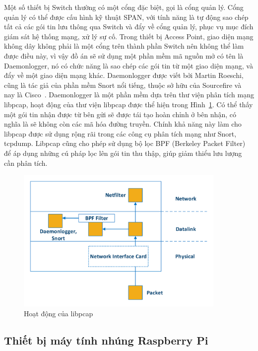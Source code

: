 Một số thiết bị Switch thường có một cổng đặc biệt, gọi là cổng quản lý. Cổng quản lý có thể được cấu hình kỹ thuật SPAN, với tính năng là tự động sao chép tất cả các gói tin lưu thông qua Switch và đẩy về cổng quản lý, phục vụ mục đích giám sát hệ thống mạng, xử lý sự cố. Trong thiết bị Access Point, giao diện mạng không dây không phải là một cổng trên thành phần Switch nên không thể làm được điều này, vì vậy đồ án sẽ sử dụng một phần mềm mã nguồn mở có tên là Daemonlogger, nó có chức năng là sao chép các gói tin từ một giao diện mạng, và đẩy về một giao diện mạng khác. Daemonlogger được viết bởi Martin Roeschi, cũng là tác giả của phần mềm Snort nổi tiếng, thuộc sở hữu của Sourcefire và nay là Cisco~\cite{martin2008daemonlogger}. Daemonlogger là một phần mềm dựa trên thư viện phân tích mạng libpcap, hoạt động của thư viện libpcap được thể hiện trong Hình~\ref{fig:libpcap-works}. Có thể thấy một gói tin nhận được từ bên gửi sẽ được tái tạo hoàn chỉnh ở bên nhận, có nghĩa là sẽ không còn các mã hóa đường truyền. Chính khả năng này làm cho libpcap được sử dụng rộng rãi trong các công cụ phân tích mạng như Snort, tcpdump. Libpcap cũng cho phép sử dụng bộ lọc BPF (Berkeley Packet Filter) để áp dụng những cú pháp lọc lên gói tin thu thập, giúp giảm thiểu lưu lượng cần phân tích.

\begin{figure}[H]
    \centering
    \includegraphics[width=0.9\textwidth]{libpcap-works}
    \caption{
        \label{fig:libpcap-works}
        Hoạt động của libpcap}
\end{figure}

\subsection{Thiết bị máy tính nhúng Raspberry Pi}
